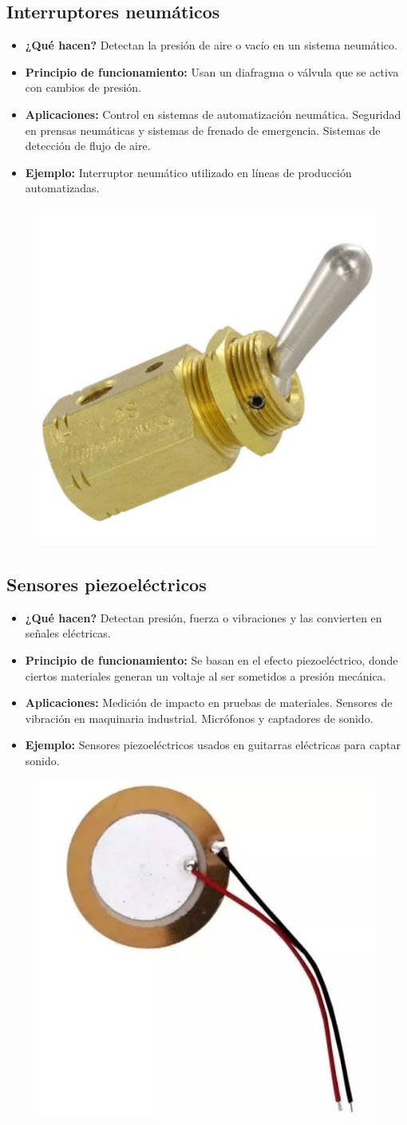 \subsection*{Interruptores neumáticos}
\begin{itemize}
	\item \textbf{¿Qué hacen?} Detectan la presión de aire o vacío en un sistema neumático.
	\item \textbf{Principio de funcionamiento:} Usan un diafragma o válvula que se activa con cambios de presión.
	\item \textbf{Aplicaciones:} Control en sistemas de automatización neumática.
	Seguridad en prensas neumáticas y sistemas de frenado de emergencia.
	Sistemas de detección de flujo de aire.
	\item \textbf{Ejemplo:} Interruptor neumático utilizado en líneas de producción automatizadas.
\end{itemize}
\begin{figure}[h]
	\centering
	\includegraphics[width=0.3\linewidth]{img/sensor neumatico}
	\label{fig:sensor neumatico}
\end{figure}
\subsection*{Sensores piezoeléctricos}
\begin{itemize}
	\item \textbf{¿Qué hacen?} Detectan presión, fuerza o vibraciones y las convierten en señales eléctricas.
	\item \textbf{Principio de funcionamiento:} Se basan en el efecto piezoeléctrico, donde ciertos materiales generan un voltaje al ser sometidos a presión mecánica.
	\item \textbf{Aplicaciones:} Medición de impacto en pruebas de materiales.
	Sensores de vibración en maquinaria industrial.
	Micrófonos y captadores de sonido.
	\item \textbf{Ejemplo:} Sensores piezoeléctricos usados en guitarras eléctricas para captar sonido.
\end{itemize}
\begin{figure}[h]
	\centering
	\includegraphics[width=0.3\linewidth]{img/sensor piezoelectrico}
	\label{fig:sensor piezoelectrico}
\end{figure}
